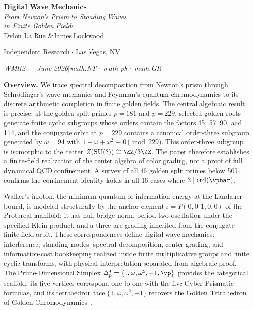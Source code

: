 

\begin{center}
\vspace*{0.5em}
{\LARGE\bfseries Digital Wave Mechanics}\\[12pt]
{\large\itshape From Newton's Prism to Standing Waves\\
in Finite Golden Fields}\\[8pt]

\vspace{1.5em}
{\large Dylon La Rue \quad\&\quad James Lockwood}

\vspace{0.5em}
{\small Independent Research $\cdot$ Las Vegas, NV}

\vspace{0.5em}
{\small\itshape WMR2 --- June 2026\quad$|$\quad math.NT $\cdot$ math-ph $\cdot$ math.GR}
\end{center}

\vspace{1em}

\vspace{1em}\noindent\textbf{Overview.}
We trace spectral decomposition from Newton's prism through Schr\"odinger's wave mechanics and Feynman's quantum chromodynamics to its discrete arithmetic completion in finite golden fields. The central algebraic result is precise: at the golden split primes $p = 181$ and $p = 229$, selected golden roots generate finite cyclic subgroups whose orders contain the factors 45, 57, 90, and 114, and the conjugate orbit at $p = 229$ contains a canonical order-three subgroup generated by $\omega = 94$ with $1 + \omega + \omega^2 \equiv 0 \pmod{229}$. This order-three subgroup is isomorphic to the center $Z(\mathrm{SU}(3)) \cong \ZZ/3\ZZ$. The paper therefore establishes a finite-field realization of the center algebra of color grading, not a proof of full dynamical QCD confinement. A survey of all 45 golden split primes below 500 confirms the confinement identity holds in all 16 cases where $3 \mid \mathrm{ord}(\vpbar)$.

Walker's infoton, the minimum quantum of information-energy at the Landauer bound, is modeled structurally by the anchor element $\iota = P(0,0,1,0,0)$ of the Protoreal manifold: it has null bridge norm, period-two oscillation under the specified Klein product, and a three-arc grading inherited from the conjugate finite-field orbit. These correspondences define digital wave mechanics: interference, standing modes, spectral decomposition, center grading, and information-cost bookkeeping realized inside finite multiplicative groups and finite cyclic transforms, with physical interpretation separated from algebraic proof. The Prime-Dimensional Simplex $\Delta^4_p = \{1, \omega, \omega^2, -1, \vp\}$ provides the categorical scaffold: its five vertices correspond one-to-one with the five Cyber Prismatic formulas, and its tetrahedron face $\{1, \omega, \omega^2, -1\}$ recovers the Golden Tetrahedron of Golden Chromodynamics~\cite{larue_chromatic}.
\vspace{1em}


